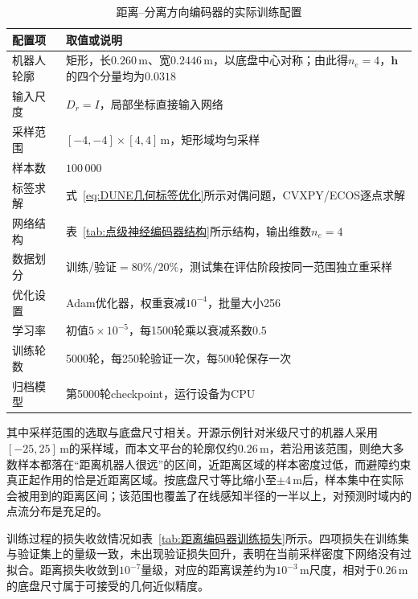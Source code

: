 \begin{table}[!htb]
	\centering
	\small
	\caption{距离--分离方向编码器的实际训练配置}
	\label{tab:距离编码器训练配置}
	\begin{tabular}{p{}p{}}
		\toprule
		配置项 & 取值或说明 \\
		\midrule
		机器人轮廓 & 矩形，长$0.260\,\mathrm{m}$、宽$0.2446\,\mathrm{m}$，以底盘中心对称；由此得$n_e=4$，$\mathbf h$的四个分量均为$0.0318$ \\
		输入尺度 & $D_r=I$，局部坐标直接输入网络 \\
		采样范围 & $\left[-4,-4\right]\times\left[4,4\right]\,\mathrm{m}$，矩形域均匀采样 \\
		样本数 & $100\,000$ \\
		标签求解 & 式~\eqref{eq:DUNE几何标签优化}所示对偶问题，CVXPY/ECOS逐点求解 \\
		网络结构 & 表~\ref{tab:点级神经编码器结构}所示结构，输出维数$n_e=4$ \\
		数据划分 & 训练/验证$=80\%/20\%$，测试集在评估阶段按同一范围独立重采样 \\
		优化设置 & Adam优化器，权重衰减$10^{-4}$，批量大小256 \\
		学习率 & 初值$5\times10^{-5}$，每1500轮乘以衰减系数$0.5$ \\
		训练轮数 & 5000轮，每250轮验证一次，每500轮保存一次 \\
		归档模型 & 第5000轮checkpoint，运行设备为CPU \\
		\bottomrule
	\end{tabular}
\end{table}

其中采样范围的选取与底盘尺寸相关。开源示例针对米级尺寸的机器人采用$\left[-25,25\right]\,\mathrm{m}$的采样域，而本文平台的轮廓仅约$0.26\,\mathrm{m}$，若沿用该范围，则绝大多数样本都落在“距离机器人很远”的区间，近距离区域的样本密度过低，而避障约束真正起作用的恰是近距离区域。按底盘尺寸等比缩小至$\pm4\,\mathrm{m}$后，样本集中在实际会被用到的距离区间；该范围也覆盖了在线感知半径的一半以上，对预测时域内的点流分布是充足的。

训练过程的损失收敛情况如表~\ref{tab:距离编码器训练损失}所示。四项损失在训练集与验证集上的量级一致，未出现验证损失回升，表明在当前采样密度下网络没有过拟合。距离损失收敛到$10^{-7}$量级，对应的距离误差约为$10^{-3}\,\mathrm{m}$尺度，相对于$0.26\,\mathrm{m}$的底盘尺寸属于可接受的几何近似精度。

